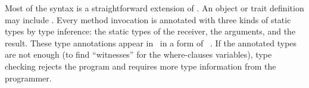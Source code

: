 Most of the syntax is a straightforward extension of \basiccore.
An object or trait definition may include \wc.
Every method invocation is annotated with three kinds of static
types by type inference: the static types of the receiver, the
arguments, and the result.
These type annotations appear in \wherecore\ in a form of \tyAsc\ \ty.
If the annotated types are not enough (to find
``witnesses'' for the where-clauses variables), type checking rejects the
program and requires more type information from the programmer.
